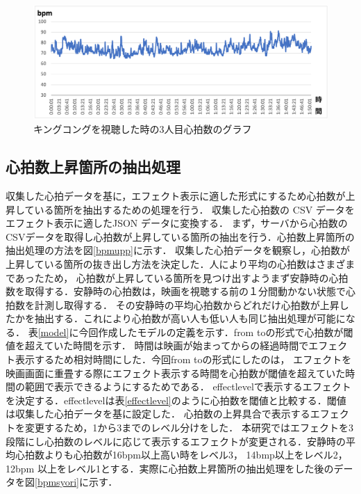 \begin{figure}[H]
    \centering
    \includegraphics[width=16cm]{images/chapter3/gurafu1.png}
    \caption{キングコングを視聴した時の3人目心拍数のグラフ}
    \label{sannninme}
\end{figure}

\subsection{心拍数上昇箇所の抽出処理}
収集した心拍データを基に，エフェクト表示に適した形式にするため心拍数が上昇している箇所を抽出するための処理を行う．
収集した心拍数の CSV データをエフェクト表示に適したJSON データに変換する．
まず，サーバから心拍数のCSVデータを取得し心拍数が上昇している箇所の抽出を行う．心拍数上昇箇所の抽出処理の方法を図\ref{bpmupp}に示す．
収集した心拍データを観察し，心拍数が上昇している箇所の抜き出し方法を決定した．人により平均の心拍数はさまざまであったため，
心拍数が上昇している箇所を見つけ出すようまず安静時の心拍数を取得する．安静時の心拍数は，映画を視聴する前の１分間動かない状態で心拍数を計測し取得する．
その安静時の平均心拍数からどれだけ心拍数が上昇したかを抽出する．これにより心拍数が高い人も低い人も同じ抽出処理が可能になる．
表\ref{model}に今回作成したモデルの定義を示す．from toの形式で心拍数が閾値を超えていた時間を示す．
時間は映画が始まってからの経過時間でエフェクト表示するため相対時間にした．今回from toの形式にしたのは，
エフェクトを映画画面に重畳する際にエフェクト表示する時間を心拍数が閾値を超えていた時間の範囲で表示できるようにするためである．
effectlevelで表示するエフェクトを決定する．effectlevelは表\ref{effectlevel}のように心拍数を閾値と比較する．閾値は収集した心拍データを基に設定した．
心拍数の上昇具合で表示するエフェクトを変更するため，1から3までのレベル分けをした．
本研究ではエフェクトを3段階にし心拍数のレベルに応じて表示するエフェクトが変更される．安静時の平均心拍数よりも心拍数が16bpm以上高い時をレベル3，
14bmp以上をレベル2，12bpm 以上をレベル1とする．実際に心拍数上昇箇所の抽出処理をした後のデータを図\ref{bpmsyori}に示す．


